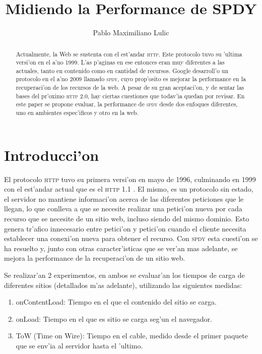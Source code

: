 \documentclass[a4paper,11pt,twocolumn]{article}
\begin{document}
\setlength{\columnsep}{25pt}

\title{Midiendo la Performance de SPDY}
\author{Pablo Maximiliano Lulic}

\maketitle

\begin{abstract} 
Actualmente, la Web se sustenta con el est'andar \textsc{http}. Este protocolo tuvo su 'ultima versi'on en el a'no 1999. L'as p'aginas en ese entonces eran muy diferentes a las actuales, tanto en contenido como en cantidad de recursos. Google desarroll'o un protocolo en el a'no 2009 llamado \textsc{spdy}, cuyo prop'osito es mejorar la performance en la recuperaci'on de los recursos de la web. A pesar de su gran aceptaci'on, y de sentar las bases del pr'oximo \textsc{http 2.0}, hay ciertas cuestiones que todav'ia quedan por revisar. En este paper se propone evaluar, la performance de \textsc{spdy} desde dos enfoques diferentes, uno en ambientes espec'ificos y otro en la web.
\end{abstract}

\section{Introducci'on}

El protocolo \textsc{http} tuvo su primera versi'on en mayo de 1996, culminando en 1999 con el est'andar actual que es el \textsc{http}  1.1 \cite{rfcHTTP}. El mismo, es un protocolo sin estado, el servidor no mantiene informaci'on acerca de las diferentes peticiones que le llegan, lo que conlleva a que se necesite realizar una petici'on nueva por cada recurso que se necesite de un sitio web, incluso siendo del mismo dominio. Esto genera tr'afico innecesario entre petici'on y petici'on cuando el cliente necesita establecer una conexi'on nueva para obtener el recurso. Con \textsc{spdy} esta cuesti'on se ha resuelto y, junto con otras caracter'isticas que se ver'an mas adelante, se mejora la performance de la recuperaci'on de un sitio web.

Se realizar'an 2 experimentos, en ambos se evaluar'an los tiempos de carga de diferentes sitios (detallados m'as adelante), utilizando las siguientes medidas:

\begin{enumerate}
\item onContentLoad: Tiempo en el que el contenido del sitio se carga.
\item onLoad: Tiempo en el que es sitio se carga seg'un el navegador.
\item ToW (Time on Wire): Tiempo en el cable, medido desde el primer paquete que se env'ia al servidor hasta el 'ultimo.
\end{enumerate}
\end{document}
